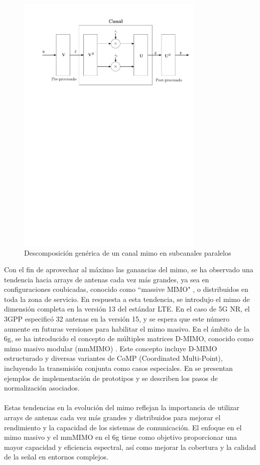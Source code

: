 \begin{figure}[h!]
    \centering
    \includegraphics[width=0.8\textwidth]{archivos/img/teoria/fig_3.pdf}
    \caption{Descomposición genérica de un canal \gls{mimo} en subcanales paralelos}
    \label{fig:fig_3}
\end{figure}

Con el fin de aprovechar al máximo las ganancias del \gls{mimo}, se ha observado una tendencia hacia arrays de antenas cada vez más grandes, ya sea en configuraciones coubicadas, conocido como ``massive MIMO" \cite{bjornson2016massive}, o distribuidos en toda la zona de servicio. En respuesta a esta tendencia, se introdujo el \gls{mimo} de dimensión completa en la versión 13 del estándar LTE. En el caso de 5G NR, el 3GPP especificó 32 antenas en la versión 15, y se espera que este número aumente en futuras versiones para habilitar el \gls{mimo} masivo. En el ámbito de la \gls{6g}, se ha introducido el concepto de múltiples matrices D-MIMO, conocido como \gls{mimo} masivo modular (mmMIMO) \cite{jeon2021mimo}. Este concepto incluye D-MIMO estructurado y diversas variantes de CoMP (Coordinated Multi-Point), incluyendo la transmisión conjunta como casos especiales. En \cite{jeon2021mimo} se presentan ejemplos de implementación de prototipos y se describen los pasos de normalización asociados.\\
\\
Estas tendencias en la evolución del \gls{mimo} reflejan la importancia de utilizar arrays de antenas cada vez más grandes y distribuidos para mejorar el rendimiento y la capacidad de los sistemas de comunicación. El enfoque en el \gls{mimo} masivo y el mmMIMO en el \gls{6g} tiene como objetivo proporcionar una mayor capacidad y eficiencia espectral, así como mejorar la cobertura y la calidad de la señal en entornos complejos. 

